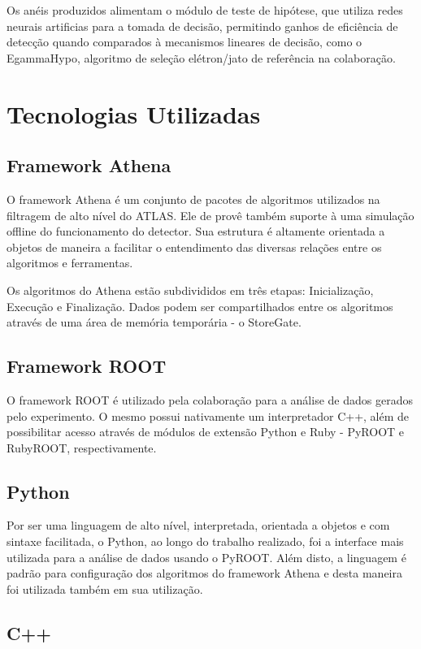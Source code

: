 \documentclass[a4paper,10pt,titlepage]{article}
\begin{document}
Os anéis produzidos alimentam o módulo de teste de hipótese, que utiliza redes neurais artificias para a tomada de decisão, permitindo ganhos de eficiência de detecção quando comparados à mecanismos lineares de decisão, como o EgammaHypo, algoritmo de seleção elétron/jato de referência na colaboração.

\section{Tecnologias Utilizadas}

\subsection{Framework Athena}

O framework Athena é um conjunto de pacotes de algoritmos utilizados na filtragem de alto nível do ATLAS. Ele de provê também suporte à uma simulação offline do funcionamento do detector.
Sua estrutura é altamente orientada a objetos de maneira a facilitar o entendimento das diversas relações entre os algoritmos e ferramentas.

Os algoritmos do Athena estão subdivididos em três etapas: Inicialização, Execução e Finalização.
Dados podem ser compartilhados entre os algoritmos através de uma área de memória temporária - o StoreGate.

\subsection{Framework ROOT}

O framework ROOT é utilizado pela colaboração para a análise de dados gerados pelo experimento.
O mesmo possui nativamente um interpretador C++, além de possibilitar acesso através de módulos de extensão Python e Ruby - PyROOT e RubyROOT, respectivamente.

\subsection{Python}

Por ser uma linguagem de alto nível, interpretada, orientada a objetos e com sintaxe facilitada, o Python, ao longo do trabalho realizado, foi a interface mais utilizada para a análise de dados usando o PyROOT.
Além disto, a linguagem é padrão para configuração dos algoritmos do framework Athena e desta maneira foi utilizada também em sua utilização.

\subsection{C++}
\end{document}

